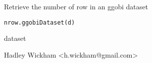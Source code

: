 \begin{Description}\relax
Retrieve the number of row in an ggobi dataset
\end{Description}
\begin{Usage}
\begin{verbatim}nrow.ggobiDataset(d)\end{verbatim}
\end{Usage}
\begin{Arguments}
\begin{ldescription}
\item[\code{d}] dataset
\end{ldescription}
\end{Arguments}
\begin{Details}\relax
\end{Details}
\begin{Author}\relax
Hadley Wickham <h.wickham@gmail.com>
\end{Author}
\begin{Examples}
\begin{ExampleCode}\end{ExampleCode}
\end{Examples}

